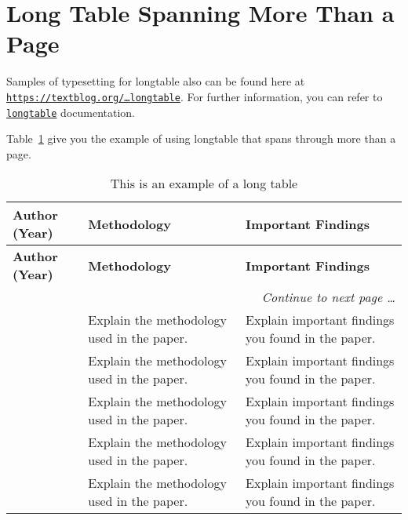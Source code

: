 \section{Long Table Spanning More Than a Page}

Samples of typesetting for longtable also can be found here at \href{https://texblog.org/2011/05/15/multi-page-tables-using-longtable/}{\texttt{https://textblog.org/\ldots longtable}}. For further information, you can refer to \href{https://download.nus.edu.sg/mirror/ctan/macros/latex/required/tools/longtable.pdf}{\texttt{longtable}} documentation.

Table~\ref{tab:longtable} give you the example of using longtable that spans through more than a page. 

\begin{singlespace}
\renewcommand{\arraystretch}{1.5}	%
\begin{longtable}{m{} m{} m{}}
	\caption{This is an example of a long table \label{tab:longtable}}	\\[2pc]	%
	\toprule[1.2pt]
	\textbf{Author (Year)} & \textbf{Methodology} & \textbf{Important Findings} \\ 	
	\midrule
	\endfirsthead	%
	\toprule[1.2pt]
	\textbf{Author (Year)} & \textbf{Methodology} & \textbf{Important Findings} \\ 	
	\midrule
	\endhead %
	\bottomrule \multicolumn{3}{r}{\textit{\footnotesize Continue to next page \ldots}} \\
	\endfoot	%
	\bottomrule[1.2pt]
	\endlastfoot
	\citet{latex:companion} & Explain the methodology used in the paper. & Explain important findings you found in the paper. \\[12pt]
	\citet{othman2019effect} & Explain the methodology used in the paper. & Explain important findings you found in the paper. \\
	\citet{wanna2018fracture} & Explain the methodology used in the paper. & Explain important findings you found in the paper. \\
	\citet{matsom:template} & Explain the methodology used in the paper. & Explain important findings you found in the paper. \\
	\citet{othman2019effect} & Explain the methodology used in the paper. & Explain important findings you found in the paper. \\

\end{longtable}
\end{singlespace}
